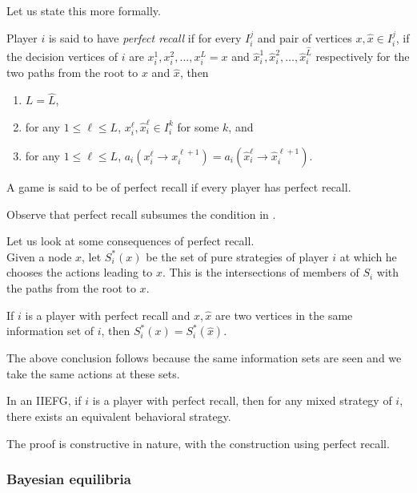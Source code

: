 		Let us state this more formally.

		\begin{fdef}
			Player $i$ is said to have \emph{perfect recall} if for every $I_i^j$ and pair of vertices $x,\hat{x} \in I_i^j$, if the decision vertices of $i$ are $x_i^1,x_i^2,\ldots,x_i^L = x$ and $\hat{x}_i^1,\hat{x}_i^2,\ldots,\hat{x}_i^{\hat{L}}$ respectively for the two paths from the root to $x$ and $\hat{x}$, then
			\begin{enumerate}
				\item $L = \hat{L}$,
				\item for any $1 \le \ell \le L$, $x_i^\ell,\hat{x}_i^\ell \in I_i^k$ for some $k$, and
				\item for any $1 \le \ell \le L$, $a_i(x_i^\ell \to x_i^{\ell+1}) = a_i(\hat{x}_i^\ell \to \hat{x}_i^{\ell+1})$.
			\end{enumerate}
			A game is said to be of perfect recall if every player has perfect recall.
		\end{fdef}

		Observe that perfect recall subsumes the condition in .

		Let us look at some consequences of perfect recall.\\
		Given a node $x$, let $S_i^*(x)$ be the set of pure strategies of player $i$ at which he chooses the actions leading to $x$. This is the intersections of members of $S_i$ with the paths from the root to $x$.
		\begin{ftheo}
			If $i$ is a player with perfect recall and $x,\hat{x}$ are two vertices in the same information set of $i$, then $S_i^*(x) = S_i^*(\hat{x})$.
		\end{ftheo}

		The above conclusion follows because the same information sets are seen and we take the same actions at these sets.

		\begin{ftheo}[Kuhn]
			In an IIEFG, if $i$ is a player with perfect recall, then for any mixed strategy of $i$, there exists an equivalent behavioral strategy.
		\end{ftheo}
		The proof is constructive in nature, with the construction using perfect recall.\\

	\subsubsection{Bayesian equilibria}

